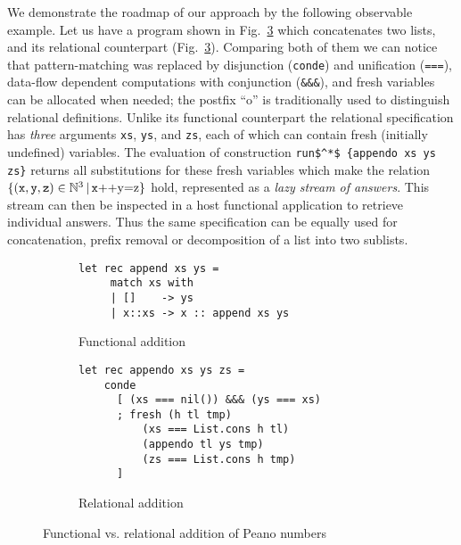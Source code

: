 We demonstrate the roadmap of our approach by the following observable example. Let us have a program
shown in Fig.~\ref{fun_vs_rel} which concatenates two lists,
and its relational counterpart (Fig.~\ref{fun_vs_rel}).
Comparing both of them we can notice that pattern-matching was replaced by disjunction (\lstinline[language=ocanren,basicstyle=\small]|conde|)
and unification (\lstinline[language=ocanren,basicstyle=\small]|===|), data-flow dependent computations with conjunction (\lstinline[language=ocanren,basicstyle=\small]|&&&|),
and fresh variables can be allocated when needed; the postfix ``o'' is traditionally used to distinguish relational definitions.
Unlike its functional
counterpart the relational specification has \emph{three} arguments \lstinline[language=ocanren,basicstyle=\small]|xs|, \lstinline[language=ocanren,basicstyle=\small]|ys|,
and \lstinline[language=ocanren,basicstyle=\small]|zs|, each of which can contain fresh (initially undefined) variables.
The evaluation of construction \lstinline[language=ocanren,basicstyle=\small]|run$^*$ {appendo xs ys zs}| returns all substitutions for these
fresh variables which make the relation $\{(\mbox{\texttt x}, \mbox{\texttt y}, \mbox{\texttt z})\in\mathbb{N}^3\, |\, \mbox{\texttt x++y=z}\}$ hold, represented as a \emph{lazy stream of answers}. This stream can
then be inspected in a host functional application to retrieve individual answers.
Thus the same specification can be equally used for concatenation,
prefix removal or decomposition of a list into two sublists.

\begin{figure}[t]
  \begin{subfigure}[t]{0.5\textwidth}
  \begin{lstlisting}[language=ocanren,basicstyle=\small]
   let rec append xs ys =
     match xs with
     | []    -> ys
     | x::xs -> x :: append xs ys
  \end{lstlisting}
  \caption{Functional addition}
  \label{funadd}
  \end{subfigure}
  \begin{subfigure}[t]{0.5\textwidth}
    \begin{lstlisting}[language=ocanren,basicstyle=\small]
  let rec appendo xs ys zs =
    conde
      [ (xs === nil()) &&& (ys === xs)
      ; fresh (h tl tmp)
          (xs === List.cons h tl)
          (appendo tl ys tmp)
          (zs === List.cons h tmp)
      ]
    \end{lstlisting}
    \caption{Relational addition}
    \label{reladd}
  \end{subfigure}
  \caption{Functional vs. relational addition of Peano numbers}
  \label{fun_vs_rel}
\end{figure}
